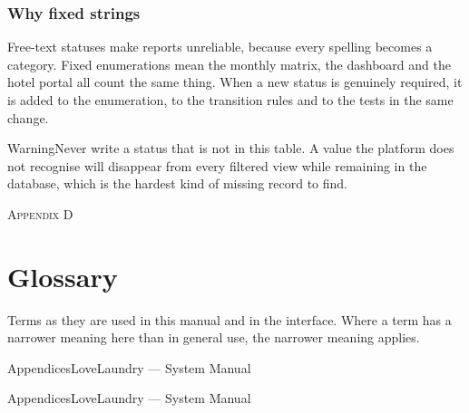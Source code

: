 \documentclass[11pt,a4paper,oneside]{book}
\begin{document}
\subsubsection*{Why fixed strings}
Free-text statuses make reports unreliable, because every spelling becomes a category. Fixed enumerations mean the monthly matrix, the dashboard and the hotel portal all count the same thing. When a new status is genuinely required, it is added to the enumeration, to the transition rules and to the tests in the same change.

\begin{notebox}WarningNever write a status that is not in this table. A value the platform does not recognise will disappear from every filtered view while remaining in the database, which is the hardest kind of missing record to find.\end{notebox}
\textsc{\small\color{crimson}Appendix D}\par\medskip
\section*{Glossary}
Terms as they are used in this manual and in the interface. Where a term has a narrower meaning here than in general use, the narrower meaning applies.

AppendicesLoveLaundry — System Manual

AppendicesLoveLaundry — System Manual
\end{document}
